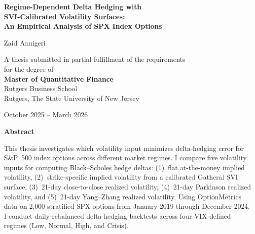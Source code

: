 \documentclass[12pt, letterpaper]{article}
\begin{document}
\begin{titlepage}
\centering
\vspace*{2cm}

{\LARGE\bfseries Regime-Dependent Delta Hedging with\\[0.3cm]
SVI-Calibrated Volatility Surfaces:\\[0.3cm]
An Empirical Analysis of SPX Index Options\par}

\vspace{2cm}

{\Large Zaid Annigeri\par}

\vspace{1cm}

{\large
A thesis submitted in partial fulfillment of the requirements\\
for the degree of\\[0.5cm]
\textbf{Master of Quantitative Finance}\\[0.5cm]
Rutgers Business School\\
Rutgers, The State University of New Jersey\par}

\vspace{2cm}

{\large October 2025 -- March 2026\par}

\vfill

\end{titlepage}

\newpage
\thispagestyle{plain}
\begin{center}
{\Large\bfseries Abstract}
\end{center}

\noindent
This thesis investigates which volatility input minimizes delta-hedging error for S\&P~500 index options across different market regimes. I compare five volatility inputs for computing Black--Scholes hedge deltas: (1)~flat at-the-money implied volatility, (2)~strike-specific implied volatility from a calibrated Gatheral SVI surface, (3)~21-day close-to-close realized volatility, (4)~21-day Parkinson realized volatility, and (5)~21-day Yang--Zhang realized volatility. Using OptionMetrics data on 2,000 stratified SPX options from January 2019 through December 2024, I conduct daily-rebalanced delta-hedging backtests across four VIX-defined regimes (Low, Normal, High, and Crisis).
\end{document}

